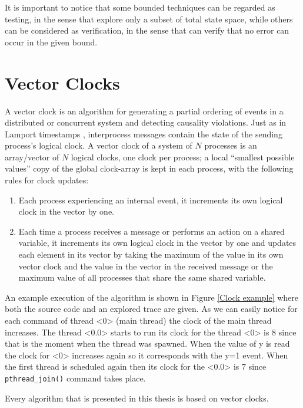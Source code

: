 It is important to notice that some bounded techniques can be regarded as testing, in the sense that explore only a subset of total state space, while
others can be considered as verification, in the sense that can verify that no error can occur in the given bound.

\section{Vector Clocks}

A vector clock is an algorithm for generating a partial ordering of events in a distributed or concurrent system and detecting causality violations. 
Just as in Lamport timestamps \cite{Lamp}, interprocess messages contain the state of the sending process's logical clock. 
A vector clock of a system of $N$ processes is an array/vector of $N$ logical clocks, one clock per process; 
a local ``smallest possible values'' copy of the global clock-array is kept in each process, with the following rules for clock updates:

\begin{enumerate}
    \item Each process experiencing an internal event, it increments its own logical clock in the vector by one.
    \item Each time a process receives a message or performs an action on a shared variable, it increments its own logical clock in the vector by one and updates each element in its vector 
    by taking the maximum of the value in its own vector clock and the value in the vector in the received message or the maximum value of all processes that share
    the same shared variable.
\end{enumerate}

An example execution of the algorithm is shown in Figure \ref{Clock example} where both the source code and an explored trace are given.
As we can easily notice for each command of thread <0> (main thread) the clock of the main thread increases. The thread <0.0> starts to run its clock for the thread <0> is 8 since 
that is the moment when the thread was spawned. When the value of y is read the clock for <0> increases again so it corresponds with the y=1 event. When the first thread is
scheduled again then its clock for the <0.0> is 7 since \verb|pthread_join()| command takes place.



Every algorithm that is presented in this thesis is based on vector clocks.


